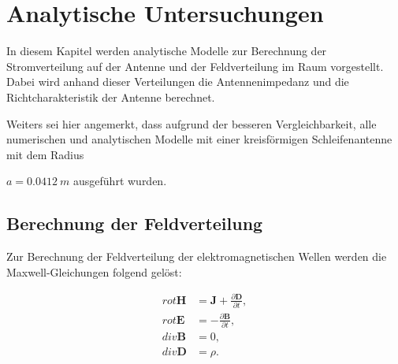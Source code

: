 \section{Analytische Untersuchungen}
In diesem Kapitel werden analytische Modelle zur Berechnung der Stromverteilung auf der Antenne und der Feldverteilung im Raum vorgestellt. Dabei wird anhand dieser Verteilungen die Antennenimpedanz und die Richtcharakteristik der Antenne berechnet.

Weiters sei hier angemerkt, dass aufgrund der besseren Vergleichbarkeit, alle numerischen und analytischen Modelle mit einer kreisförmigen Schleifenantenne mit dem Radius 

$a=0.0412\ m$ ausgeführt wurden. 

\subsection{Berechnung der Feldverteilung}
Zur Berechnung der Feldverteilung der elektromagnetischen Wellen werden die Maxwell-Gleichungen folgend gelöst:

\begin{subequations}
\begin{align}
rot \mathbf{H} &= \mathbf{J} + \frac{\partial \mathbf{D}}{\partial t},\label{eq:max1}\\
rot \mathbf{E} &= -\frac{\partial \mathbf{B}}{\partial t},\label{eq:max2}\\
div \mathbf{B} &= 0\label{eq:max3},\\
div \mathbf{D} &= \rho .\label{eq:max4}
\end{align} 
\end{subequations}